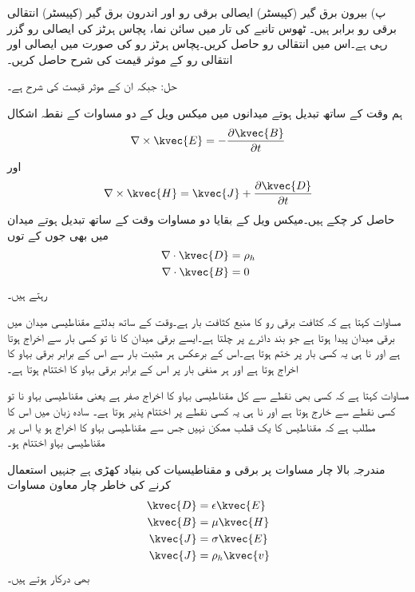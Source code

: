 پ) بیرون برق گیر (کپیسٹر)  ایصالی برقی رو اور اندرون برق گیر (کپیسٹر)  انتقالی برقی رو برابر ہیں۔
ٹھوس تانبے کی تار میں سائن نما، پچاس ہرٹز کی ایصالی رو  گزر رہی ہے۔اس میں انتقالی رو حاصل کریں۔پچاس ہرٹز رو کی صورت میں ایصالی اور انتقالی رو کے موثر قیمت کی شرح حاصل کریں۔

حل: جبکہ ان کے موثر قیمت کی شرح   ہے۔


ہم وقت کے ساتھ تبدیل ہوتے میدانوں میں میکس ویل کے دو مساوات کے نقطہ اشکال
\begin{align}\label{مساوات-میکس_ویل_تفرقی_الف}
\nabla \times \kvec{E}=-\frac{\partial \kvec{B}}{\partial t}
\end{align}
اور
\begin{align}\label{مساوات-میکس_ویل_تفرقی_ب}
\nabla \times \kvec{H}=\kvec{J}+\frac{\partial \kvec{D}}{\partial t}
\end{align}
 حاصل کر چکے ہیں۔میکس ویل کے بقایا دو مساوات وقت کے ساتھ تبدیل ہوتے میدان میں بھی جوں کے توں
\begin{align}
\nabla \cdot \kvec{D}&=\rho_h \label{مساوات_میکس_ویل_گاوس_قانون_نقطہ}\\
\nabla \cdot \kvec{B}&=0 \label{مساوات_میکس_ویل_مقناطیسی_میدان_دو_قطب}
\end{align}
 رہتے ہیں۔ 

مساوات  کہتا ہے کہ کثافت برقی رو کا منبع کثافت بار  ہے۔وقت کے ساتھ بدلتے مقناطیسی میدان میں برقی میدان  پیدا ہوتا ہے جو بند دائرے پر چلتا ہے۔ایسے برقی میدان کا نا تو کسی بار سے اخراج ہوتا ہے اور نا ہی یہ کسی بار پر ختم ہوتا ہے۔اس کے برعکس ہر مثبت بار سے اس کے برابر برقی بہاو کا اخراج ہوتا ہے اور ہر منفی بار پر اس کے برابر برقی بہاو کا اختتام ہوتا ہے۔
  

مساوات  کہتا ہے کہ کسی بھی نقطے سے کل مقناطیسی بہاو کا اخراج صفر ہے یعنی مقناطیسی بہاو نا تو کسی نقطے سے خارج ہوتا ہے اور نا ہی یہ کسی نقطے پر اختتام پذیر ہوتا ہے۔ سادہ زبان میں اس کا مطلب ہے کہ مقناطیس کا یک قطب ممکن نہیں جس سے مقناطیسی بہاو کا اخراج ہو یا اس پر مقناطیسی بہاو اختتام ہو۔

مندرجہ بالا چار مساوات پر برقی و مقناطیسیات کی بنیاد کھڑی ہے جنہیں استعمال کرنے کی خاطر چار معاون مساوات
\begin{align}
\kvec{D}&=\epsilon \kvec{E} \label{مساوات_میکس_ویل_خالی_خلاء_برقی_مستقل}\\
\kvec{B}&=\mu \kvec{H} \label{مساوات_میکس_ویل_خالی_خلاء_مقناطیسی_مستقل}\\
\kvec{J}&=\sigma \kvec{E}\\
\kvec{J}&=\rho_h \kvec{v}
\end{align}
بھی درکار ہوتے ہیں۔

